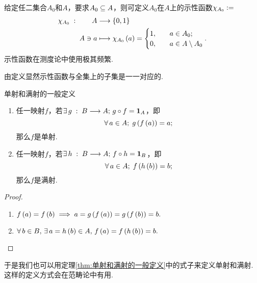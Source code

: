 \begin{definition}[示性函数]\label{示性函数}
    给定任二集合$A_0$和$A$，要求$A_0\sb A$，则可定义$A_0$在$A$上的示性函数$\chi_{A_0}\defi$
    \begin{align*}
        \chi_{A_0} \;:\qquad A &\ra \z\{0,1\y\} \\
        A\ni a &\mapsto \chi_{A_0}\z(a\y) = \begin{cases}
            1, \quad &a\in A_0;\\
            0, \quad &a\in A\m A_0
        \end{cases}.
    \end{align*}
    示性函数在测度论中使用极其频繁.

    由定义显然示性函数与全集上的子集是一一对应的.
\end{definition}

\begin{theorem}[单射和满射的一般定义]{单射和满射的一般定义}
    \begin{enumerate}
        \item 任一映射$f$，若$\exists\, g \;:\; B\ra A;\,g\circ f = \id_A$，即 \[   \forall\,a\in A;\;g\z(f\z(a\y)\y)=a;   \] 那么$f$是单射.
        \item 任一映射$f$，若$\exists\, h \;:\; B\ra A;\,f\circ h = \id_B$，即 \[   \forall\,a\in A;\;f\z(h\z(b\y)\y)=b;   \] 那么$f$是满射.
    \end{enumerate}
\end{theorem}
\begin{proof}
    \begin{enumerate}
        \item \(    f\z(a\y)=f\z(b\y) \implies a=g\z( f\z(a \y)  \y)=g\z( f\z(b \y) \y) = b.   \)
        \item \(    \forall\, b\in B,\,\exists\, a=h\z(b\y)\in A,\,f\z(a\y)=f\z(h\z(b\y)\y)=b.    \)
    \end{enumerate}
\end{proof}
于是我们也可以用定理\ref{thm:单射和满射的一般定义}中的式子来定义单射和满射. 这样的定义方式会在范畴论中有用.

